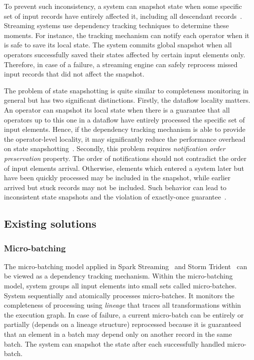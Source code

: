 To prevent such inconsistency, a system can snapshot state when some specific set of input records have entirely affected it, including all descendant records~\cite{2015arXiv150608603C, thepaper}. Streaming systems use dependency tracking techniques to determine these moments. For instance, the tracking mechanism can notify each operator when it is safe to save its local state. The system commits global snapshot when all operators successfully saved their states affected by certain input elements only. Therefore, in case of a failure, a streaming engine can safely reprocess missed input records that did not affect the snapshot.

The problem of state snapshotting is quite similar to completeness monitoring in general but has two significant distinctions. Firstly, the dataflow locality matters. An operator can snapshot its local state when there is a guarantee that all operators up to this one in a dataflow have entirely processed the specific set of input elements. Hence, if the dependency tracking mechanism is able to provide the operator-level locality, it may significantly reduce the performance overhead on state snapshotting~\cite{Carbone:2017:SMA:3137765.3137777}. Secondly, this problem requires {\em notification order preservation} property. The order of notifications should not contradict the order of input elements arrival. Otherwise, elements which entered a system later but have been quickly processed may be included in the snapshot, while earlier arrived but stuck records may not be included. Such behavior can lead to inconsistent state snapshots and the violation of exactly-once guarantee~\cite{2015arXiv150608603C}. 

\subsection{Existing solutions} \label{existing_solutions}

\subsubsection{Micro-batching}

The micro-batching model applied in Spark Streaming~\cite{Zaharia:2012:DSE:2342763.2342773} and Storm Trident~\cite{apache:storm:trident} can be viewed as a dependency tracking mechanism. Within the micro-batching model, system groups all input elements into small sets called micro-batches. System sequentially and atomically processes micro-batches. It monitors the completeness of processing using {\em lineage} that traces all transformations within the execution graph. In case of failure, a current micro-batch can be entirely or partially (depends on a lineage structure) reprocessed because it is guaranteed that an element in a batch may depend only on another record in the same batch. The system can snapshot the state after each successfully handled micro-batch. 

